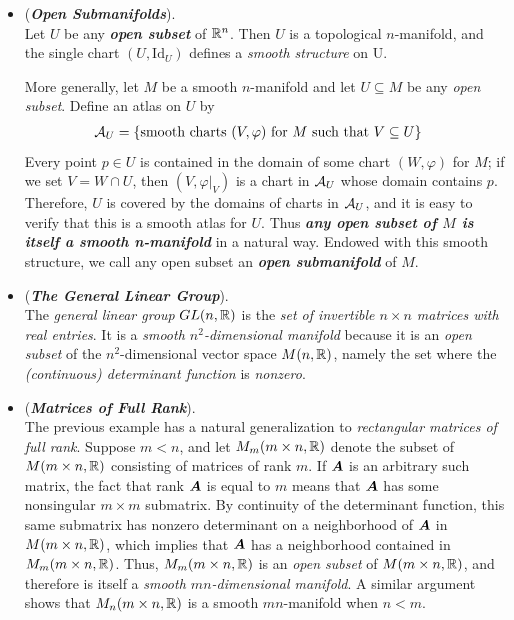 \documentclass[11pt]{article}
\begin{document}
\begin{itemize}
\item \begin{example} (\emph{\textbf{Open Submanifolds}}).\\
Let $U$ be any \emph{\textbf{open subset}} of ${\mathbb R}^n$. Then $U$ is a topological $n$-manifold, and the single chart $(U, \text{Id}_{U})$ defines a \emph{smooth structure} on U.

More generally, let $M$ be a smooth $n$-manifold and let $U \subseteq M$ be any \emph{open subset}. Define an atlas on $U$ by
\begin{align*}
{\mathcal A}_{U} &= \left\{\text{smooth charts } (V, \varphi)\text{ for }M\text{ such that }V \subseteq U\right\}
\end{align*}
Every point $p \in U$ is contained in the domain of some chart $(W, \varphi)$ for $M$; if we set $V =  W \cap U$, then $(V, \varphi|_{V})$  is a chart in ${\mathcal A}_{U}$ whose domain contains $p$. Therefore, $U$ is covered by the domains of charts in ${\mathcal A}_U$, and it is easy to verify that this is a smooth atlas for $U$. Thus \emph{\textbf{any open subset of $M$ is itself a smooth n-manifold}} in a natural way. Endowed with this smooth structure, we call any open subset an \emph{\textbf{open submanifold}} of $M$.
\end{example}

\item \begin{example} (\emph{\textbf{The General Linear Group}}).\\
The \emph{general linear group} $GL(n,{\mathbb R})$ is the \emph{set of invertible $n \times n$ matrices with real entries}. It is a \emph{smooth $n^2$-dimensional manifold} because it is an \emph{open subset} of the $n^2$-dimensional vector space $M(n, {\mathbb R})$, namely the set where the \emph{(continuous) determinant function} is \emph{nonzero}.
\end{example}

\item \begin{example} (\emph{\textbf{Matrices of Full Rank}}).\\
 The previous example has a natural generalization to \emph{rectangular matrices of full rank}. Suppose $m < n$, and let $M_{m}(m \times n, {\mathbb R})$ denote the subset of $M(m \times n, {\mathbb R})$ consisting of matrices of rank $m$. If $\boldsymbol{A}$ is an arbitrary such matrix, the fact that rank $\boldsymbol{A}$ is equal to $m$ means that $\boldsymbol{A}$ has some nonsingular $m \times m$ submatrix. By continuity of the determinant function, this same submatrix has nonzero determinant on a neighborhood of $\boldsymbol{A}$ in $M(m \times n, {\mathbb R})$, which implies that $\boldsymbol{A}$ has a neighborhood contained in $M_{m}(m \times n, {\mathbb R})$. Thus, $M_{m}(m \times n, {\mathbb R})$ is an \emph{open subset} of $M(m \times n, {\mathbb R})$, and therefore is itself a \emph{smooth $mn$-dimensional manifold}. A similar argument shows that $M_{n}(m \times n, {\mathbb R})$ is a smooth $mn$-manifold when $n < m$.
 \end{example}
 

\end{itemize}
\end{document}
